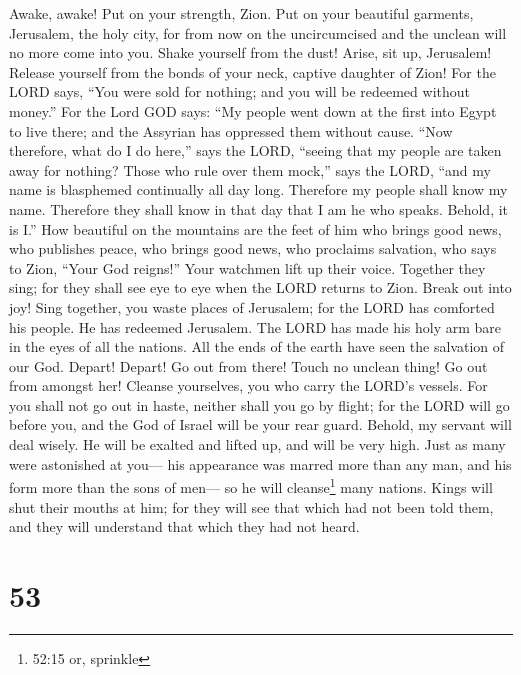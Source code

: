  Awake, awake! Put on your strength, Zion. Put on your
beautiful garments, Jerusalem, the holy city, for from now on the
uncircumcised and the unclean will no more come into you. 
Shake yourself from the dust! Arise, sit up, Jerusalem! Release yourself
from the bonds of your neck, captive daughter of Zion!  For
the LORD says, ``You were sold for nothing; and you will be redeemed
without money.''  For the Lord GOD says: ``My people went
down at the first into Egypt to live there; and the Assyrian has
oppressed them without cause.  ``Now therefore, what do I do
here,'' says the LORD, ``seeing that my people are taken away for
nothing? Those who rule over them mock,'' says the LORD, ``and my name
is blasphemed continually all day long.  Therefore my people
shall know my name. Therefore they shall know in that day that I am he
who speaks. Behold, it is I.''  How beautiful on the
mountains are the feet of him who brings good news, who publishes peace,
who brings good news, who proclaims salvation, who says to Zion, ``Your
God reigns!''  Your watchmen lift up their voice. Together
they sing; for they shall see eye to eye when the LORD returns to Zion.
 Break out into joy! Sing together, you waste places of
Jerusalem; for the LORD has comforted his people. He has redeemed
Jerusalem.  The LORD has made his holy arm bare in the eyes
of all the nations. All the ends of the earth have seen the salvation of
our God.  Depart! Depart! Go out from there! Touch no
unclean thing! Go out from amongst her! Cleanse yourselves, you who
carry the LORD's vessels.  For you shall not go out in
haste, neither shall you go by flight; for the LORD will go before you,
and the God of Israel will be your rear guard.  Behold, my
servant will deal wisely. He will be exalted and lifted up, and will be
very high.  Just as many were astonished at you--- his
appearance was marred more than any man, and his form more than the sons
of men---  so he will cleanse\footnote{52:15 or, sprinkle}
many nations. Kings will shut their mouths at him; for they will see
that which had not been told them, and they will understand that which
they had not heard.

\hypertarget{section-50}{%
\section{53}\label{section-50}}

